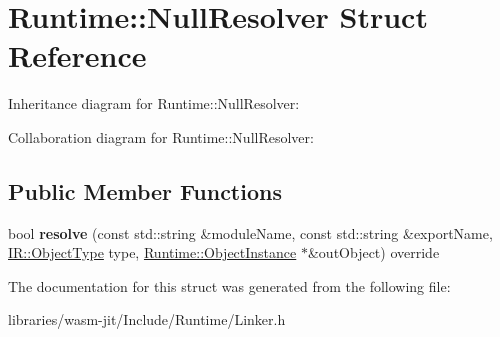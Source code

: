\hypertarget{struct_runtime_1_1_null_resolver}{}\section{Runtime\+:\+:Null\+Resolver Struct Reference}
\label{struct_runtime_1_1_null_resolver}


Inheritance diagram for Runtime\+:\+:Null\+Resolver\+:


Collaboration diagram for Runtime\+:\+:Null\+Resolver\+:
\subsection*{Public Member Functions}
\begin{DoxyCompactItemize}
\item 
\mbox{\label{struct_runtime_1_1_null_resolver_a2a6e6891570ac79ad660c78e7b8ea042}} 
bool {\bfseries resolve} (const std\+::string \&module\+Name, const std\+::string \&export\+Name, \mbox{\hyperlink{struct_i_r_1_1_object_type}{I\+R\+::\+Object\+Type}} type, \mbox{\hyperlink{struct_runtime_1_1_object_instance}{Runtime\+::\+Object\+Instance}} $\ast$\&out\+Object) override
\end{DoxyCompactItemize}


The documentation for this struct was generated from the following file\+:\begin{DoxyCompactItemize}
\item 
libraries/wasm-\/jit/\+Include/\+Runtime/Linker.\+h\end{DoxyCompactItemize}
